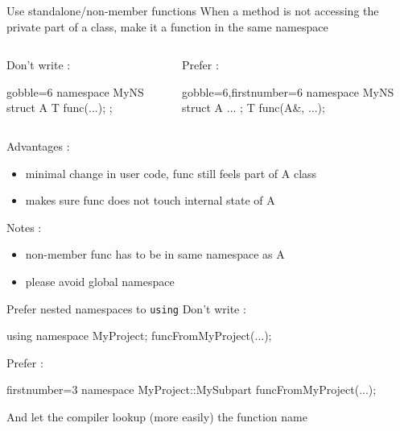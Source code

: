 \begin{frame}[fragile]
  \begin{block}{Use standalone/non-member functions}
    When a method is not accessing the private part of a class, make it a function in the same namespace
    \vspace{-1mm}
    \begin{columns}[T]
      \begin{column}{.35\textwidth}
        Don't write :
        \vspace{-1mm}
        \begin{cppcode*}{gobble=6}
          namespace MyNS {
            struct A {
              T func(...);
            };
          }
        \end{cppcode*}
      \end{column}
      \begin{column}{.35\textwidth}
        Prefer :
        \vspace{-1mm}
        \begin{cppcode*}{gobble=6,firstnumber=6}
          namespace MyNS {
            struct A { ... };
            T func(A&, ...);
          }
        \end{cppcode*}
      \end{column}
    \end{columns}
    \vspace{.2cm}
    Advantages :
    \begin{itemize}
    \item minimal change in user code, func still feels part of A class
    \item makes sure func does not touch internal state of A
    \end{itemize}
    Notes :
    \begin{itemize}
    \item non-member func has to be in same namespace as A
    \item please avoid global namespace
    \end{itemize}
  \end{block}
\end{frame}

\begin{frame}[fragile]
  \begin{block}{Prefer nested namespaces to \texttt{using}}
    Don't write :
    \begin{cppcode}
      using namespace MyProject;
      funcFromMyProject(...);
    \end{cppcode}
    Prefer :
    \begin{cppcode*}{firstnumber=3}
      namespace MyProject::MySubpart {
        funcFromMyProject(...);
      }
    \end{cppcode*}
    And let the compiler lookup (more easily) the function name
  \end{block}
\end{frame}

